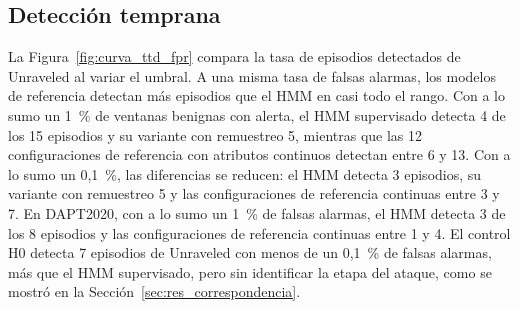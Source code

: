 \subsection{Detección temprana}
\label{sec:res_deteccion}
La Figura~\ref{fig:curva_ttd_fpr} compara la tasa de episodios detectados de Unraveled al variar el umbral. A una misma tasa de falsas alarmas, los modelos de referencia detectan más episodios que el HMM en casi todo el rango. Con a lo sumo un 1~\% de ventanas benignas con alerta, el HMM supervisado detecta 4 de los 15 episodios y su variante con remuestreo 5, mientras que las 12 configuraciones de referencia con atributos continuos detectan entre 6 y 13. Con a lo sumo un 0,1~\%, las diferencias se reducen: el HMM detecta 3 episodios, su variante con remuestreo 5 y las configuraciones de referencia continuas entre 3 y 7. En DAPT2020, con a lo sumo un 1~\% de falsas alarmas, el HMM detecta 3 de los 8 episodios y las configuraciones de referencia continuas entre 1 y 4. El control H0 detecta 7 episodios de Unraveled con menos de un 0,1~\% de falsas alarmas, más que el HMM supervisado, pero sin identificar la etapa del ataque, como se mostró en la Sección~\ref{sec:res_correspondencia}.

